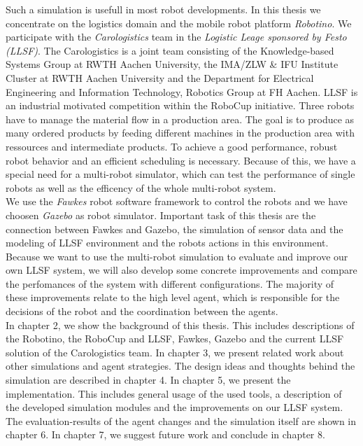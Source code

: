 Such a simulation is usefull in most robot developments. In this thesis we concentrate on the logistics domain and the mobile robot platform \textit{Robotino}. We participate with the \textit{Carologistics} team in the \textit{Logistic Leage sponsored by Festo (LLSF)}. The Carologistics is a joint team consisting of the Knowledge-based Systems Group at RWTH Aachen University, the IMA/ZLW \& IFU Institute Cluster at RWTH Aachen University and the Department for Electrical Engineering and Information Technology, Robotics Group at FH Aachen. LLSF is an industrial motivated competition within the RoboCup initiative. Three robots have to manage the material flow in a production area. The goal is to produce as many ordered products by feeding different machines in the production area with ressources and intermediate products. To achieve a good performance, robust robot behavior and an efficient scheduling is necessary. Because of this, we have a special need for a multi-robot simulator, which can test the performance of single robots as well as the efficency of the whole multi-robot system.\\
We use the \textit{Fawkes} robot software framework to control the robots and we have choosen \textit{Gazebo} as robot simulator. Important task of this thesis are the connection between Fawkes and Gazebo, the simulation of sensor data and the modeling of LLSF environment and the robots actions in this environment. Because we want to use the multi-robot simulation to evaluate and improve our own LLSF system, we will also develop some concrete improvements and compare the perfomances of the system with different configurations. The majority of these improvements relate to the high level agent, which is responsible for the decisions of the robot and the coordination between the agents.
\\
In chapter 2, we show the background of this thesis. This includes descriptions of the Robotino, the RoboCup and LLSF, Fawkes, Gazebo and the current LLSF solution of the Carologistics team. In chapter 3, we present related work about other simulations and agent strategies. The design ideas and thoughts behind the simulation are described in chapter 4. In chapter 5, we present the implementation. This includes general usage of the used tools, a description of the developed simulation modules and the improvements on our LLSF system. The evaluation-results of the agent changes and the simulation itself are shown in chapter 6. In chapter 7, we suggest future work and conclude in chapter 8.
